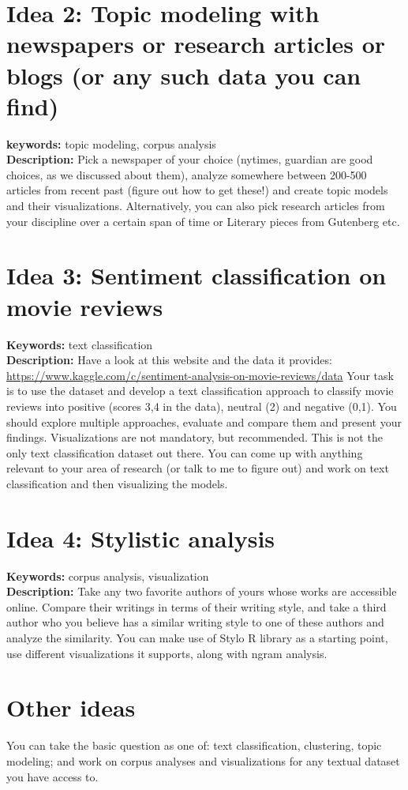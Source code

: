 \documentclass[11pt,a4paper]{article}
\begin{document}
\section*{Idea 2: Topic modeling with newspapers or research articles or blogs (or any such data you can find)} 
\textbf{keywords:} topic modeling, corpus analysis
\\ \textbf{Description:} Pick a newspaper of your choice (nytimes, guardian are good choices, as we discussed about them), analyze somewhere between 200-500 articles from recent past (figure out how to get these!) and create topic models and their visualizations.  Alternatively, you can also pick research articles from your discipline over a certain span of time or Literary pieces from Gutenberg etc. 

\section*{Idea 3: Sentiment classification on movie reviews}
\textbf{Keywords:} text classification
\\ \textbf{Description: } Have a look at this website and the data it provides: \url{https://www.kaggle.com/c/sentiment-analysis-on-movie-reviews/data} Your task is to use the dataset and develop a text classification approach to classify movie reviews into positive (scores 3,4 in the data), neutral (2) and negative (0,1). You should explore multiple approaches, evaluate and compare them and present your findings. Visualizations are not mandatory, but recommended. This is not the only text classification dataset out there. You can come up with anything relevant to your area of research (or talk to me to figure out) and work on text classification and then visualizing the models. 

\section*{Idea 4: Stylistic analysis}
\textbf{Keywords: } corpus analysis, visualization
\\ \textbf{Description:} Take any two favorite authors of yours whose works are accessible online. Compare their writings in terms of their writing style, and take a third author who you believe has a similar writing style to one of these authors and analyze the similarity. You can make use of Stylo R library as a starting point, use different visualizations it supports, along with ngram analysis. 

\section*{Other ideas}
You can take the basic question as one of: text classification, clustering, topic modeling; and work on corpus analyses and visualizations for any textual dataset you have access to. 
\end{document}
